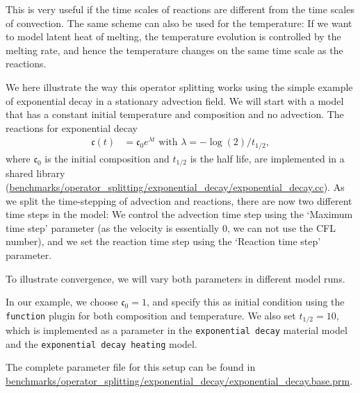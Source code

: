\documentclass{article}
\begin{document}
This is very useful if the time scales of reactions are different from the time scales of convection.
The same scheme can also be used for the temperature: If we want to model latent heat of melting, the temperature evolution is controlled by the melting rate, and hence the temperature changes on the same time scale as the reactions.

We here illustrate the way this operator splitting works using the simple example of exponential decay in a stationary advection field. We will start with a model that has a constant initial temperature and composition and no advection. The reactions for exponential decay
\begin{align}
  \mathfrak{c}(t)
  &=
  \mathfrak{c}_0 e^{\lambda t} \text{ with } \lambda = - \log(2)/t_{1/2},
\end{align}
where $\mathfrak{c}_0$ is the initial composition and $t_{1/2}$ is the half life, are implemented in a shared library
(\url{benchmarks/operator_splitting/exponential_decay/exponential_decay.cc}).
As we split the time-stepping of advection and reactions, there are now two different time steps in the model:
We control the advection time step using the `Maximum time step' parameter (as the velocity is essentially 0,
we can not use the CFL number), and we set the reaction time step using the `Reaction time step' parameter.

To illustrate convergence, we will vary both parameters in different model runs.

In our example, we choose $\mathfrak{c}_0=1$, and specify this as initial condition using the \texttt{function} plugin for both composition and temperature. We also set $t_{1/2}=10$, which is implemented as a parameter in the \texttt{exponential decay} material model and the \texttt{exponential decay heating} model.

The complete parameter file for this setup can be found in \url{benchmarks/operator_splitting/exponential_decay/exponential_decay.base.prm}.
\end{document}
